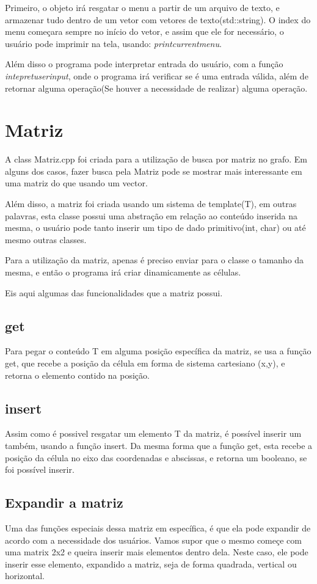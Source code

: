 \documentclass[12pt]{article}
\begin{document}
  Primeiro, o objeto irá resgatar o menu a partir de um arquivo de texto, e armazenar
  tudo dentro de um vetor com vetores de texto(std::string). O index do menu começara
  sempre no início do vetor, e assim que ele for necessário, o usuário pode imprimir na tela, usando:
  \emph{printcurrentmenu}.

  Além disso o programa pode interpretar entrada do usuário, com a função
  \emph{intepretuserinput}, onde o programa irá verificar se é uma entrada
  válida, além de retornar alguma operação(Se houver a necessidade de realizar)
  alguma operação.

  \section{Matriz}

  A class Matriz.cpp foi criada para a utilização de busca por matriz no
  grafo. Em alguns dos casos, fazer busca pela Matriz pode se mostrar mais 
  interessante em uma matriz do que usando um vector.

  Além disso, a matriz foi criada usando um sistema de template(T), em outras
  palavras, esta classe possui uma abstração em relação ao conteúdo inserida
  na mesma, o usuário pode tanto inserir um tipo de dado primitivo(int, char) ou até
  mesmo outras classes.

  Para a utilização da matriz, apenas é preciso enviar para o classe o 
  tamanho da mesma, e então o programa irá criar dinamicamente as células.

  Eis aqui algumas das funcionalidades que a matriz possui.

  \subsection{get}

  Para pegar o conteúdo T em alguma posição específica da matriz, se usa 
  a função get, que recebe a posição da célula em forma de sistema cartesiano
  (x,y), e retorna o elemento contido na posição.

  \subsection{insert} 

  Assim como é possivel resgatar um elemento T da matriz, é possível inserir
  um também, usando a função insert. Da mesma forma que a função get, esta 
  recebe a posição da célula no eixo das coordenadas e abscissas, e retorna
  um booleano, se foi possível inserir. 

  \subsection{Expandir a matriz}

  Uma das funções especiais dessa matriz em específica, é que ela pode
  expandir de acordo com a necessidade dos usuários. Vamos supor que o mesmo
  começe com uma matrix 2x2 e queira inserir mais elementos dentro dela. Neste
  caso, ele pode inserir esse elemento, expandido a matriz, seja de forma quadrada,
  vertical ou horizontal.
\end{document}
